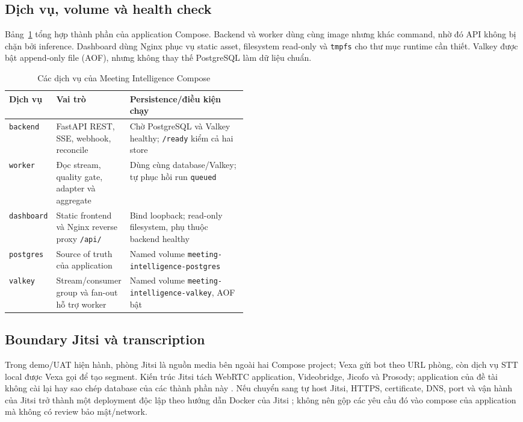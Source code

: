\subsection{Dịch vụ, volume và health check}
Bảng~\ref{tab:compose-services} tổng hợp thành phần của application Compose. Backend và worker dùng cùng image nhưng khác command, nhờ đó API không bị chặn bởi inference. Dashboard dùng Nginx phục vụ static asset, filesystem read-only và \texttt{tmpfs} cho thư mục runtime cần thiết. Valkey được bật append-only file (AOF), nhưng không thay thế PostgreSQL làm dữ liệu chuẩn.

\begin{table}[H]
\centering
\caption{Các dịch vụ của Meeting Intelligence Compose}
\label{tab:compose-services}
\begin{tabularx}{\linewidth}{p{0.18\linewidth}p{0.28\linewidth}X}
\toprule
Dịch vụ & Vai trò & Persistence/điều kiện chạy \\ \midrule
\texttt{backend} & FastAPI REST, SSE, webhook, reconcile & Chờ PostgreSQL và Valkey healthy; \texttt{/ready} kiểm cả hai store \\
\texttt{worker} & Đọc stream, quality gate, adapter và aggregate & Dùng cùng database/Valkey; tự phục hồi run \texttt{queued} \\
\texttt{dashboard} & Static frontend và Nginx reverse proxy \texttt{/api/} & Bind loopback; read-only filesystem, phụ thuộc backend healthy \\
\texttt{postgres} & Source of truth của application & Named volume \texttt{meeting-\allowbreak intelligence-\allowbreak postgres} \\
\texttt{valkey} & Stream/consumer group và fan-out hỗ trợ worker & Named volume \texttt{meeting-\allowbreak intelligence-\allowbreak valkey}, AOF bật \\
\bottomrule
\end{tabularx}
\end{table}

\subsection{Boundary Jitsi và transcription}
Trong demo/UAT hiện hành, phòng Jitsi là nguồn media bên ngoài hai Compose project; Vexa gửi bot theo URL phòng, còn dịch vụ STT local được Vexa gọi để tạo segment. Kiến trúc Jitsi tách WebRTC application, Videobridge, Jicofo và Prosody; application của đề tài không cài lại hay sao chép database của các thành phần này \cite{jitsiArchitecture2026}. Nếu chuyển sang tự host Jitsi, HTTPS, certificate, DNS, port và vận hành của Jitsi trở thành một deployment độc lập theo hướng dẫn Docker của Jitsi \cite{jitsiDocker2026}; không nên gộp các yêu cầu đó vào compose của application mà không có review bảo mật/network.

